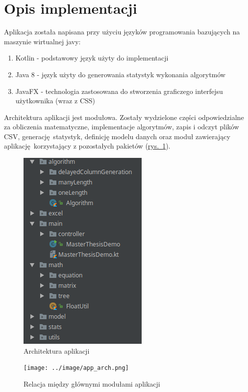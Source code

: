 \section{Opis implementacji}
\label{sec:implemenation}
Aplikacja została napisana przy użyciu języków programowania bazujących na maszynie wirtualnej javy:
\begin{enumerate}
  \item Kotlin - podstawowy język użyty do implementacji
  \item Java 8 - język użyty do generowania statystyk wykonania algorytmów
  \item JavaFX - technologia zastosowana do stworzenia graficzego interfejsu użytkownika (wraz z CSS)
\end{enumerate}

Architektura aplikacji jest modułowa. Zostały wydzielone części odpowiedzialne za obliczenia matematyczne, implementacje algorytmów, zapis i odczyt plików CSV, generację statystyk, definicję modelu danych oraz moduł zawierający aplikację korzystający z pozostałych pakietów (\hyperref[fig:arch]{rys.~\ref*{fig:arch}}).

\begin{figure}[h]
  \center
  \includegraphics[scale=0.65]{../image/arch.png}
  \caption{Architektura aplikacji}
  \label{fig:arch}
\end{figure}

\begin{figure}[h]
  \center
  \texttt{[image: ../image/app\_arch.png]}
  \caption{Relacja między głównymi modułami aplikacji}
  \label{fig:app_arch}
\end{figure}

